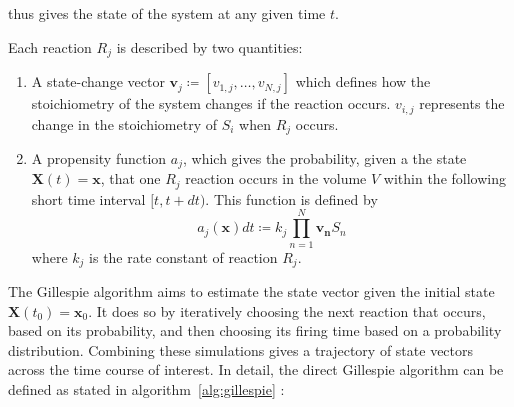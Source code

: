 thus gives the state of the system at any given time $t$.

Each reaction $R_{j}$ is described by two quantities:
\begin{enumerate}
  \item A state-change vector $\mathbf{v}_{j} \coloneqq [v_{1,j}, \ldots , v_{N,j}]$ which defines how the stoichiometry of the system changes if the reaction occurs.
        $v_{i,j}$ represents the change in the stoichiometry of $S_{i}$ when $R_{j}$ occurs.
  \item A propensity function $a_{j}$, which gives the probability, given a the state $\mathbf{X}(t) = \mathbf{x}$, that one $R_{j}$ reaction occurs in the volume $V$ within the following short time interval $[t, t+dt)$.
        This function is defined by
        \begin{equation}
          a_{j}(\mathbf{x})dt \coloneqq k_{j} \prod_{n=1}^{N}\mathbf{v_{n}}S_{n}
          \label{eq:gillespie-propensity}
        \end{equation}
        where $k_{j}$ is the rate constant of reaction $R_{j}$.
\end{enumerate}

The Gillespie algorithm aims to estimate the state vector given the initial state $\mathbf{X}(t_{0}) = \mathbf{x}_{0}$.
It does so by iteratively choosing the next reaction that occurs, based on its probability, and then choosing its firing time based on a probability distribution.
Combining these simulations gives a trajectory of state vectors across the time course of interest.
In detail, the direct Gillespie algorithm can be defined as stated in algorithm~\ref{alg:gillespie} \parencite{gillespieStochasticSimulationChemical2007}:


